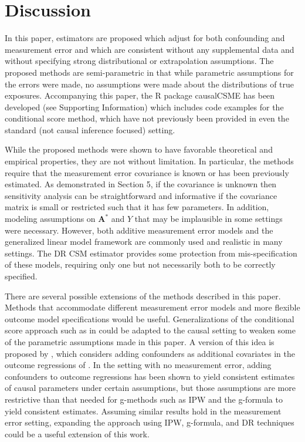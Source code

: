 \documentclass[useAMS,usenatbib,referee]{biom}
\begin{document}
\section{Discussion}

In this paper, estimators are proposed which adjust for both confounding and measurement error and which are consistent without any supplemental data and without specifying strong distributional or extrapolation assumptions. The proposed methods are semi-parametric in that while parametric assumptions for the errors were made, no assumptions were made about the distributions of true exposures. Accompanying this paper, the R package causalCSME has been developed (see Supporting Information) which includes code examples for the conditional score method, which have not previously been provided in even the standard (not causal inference focused) setting.

While the proposed methods were shown to have favorable theoretical and empirical properties, they are not without limitation. In particular, the methods require that the measurement error covariance is known or has been previously estimated. As demonstrated in Section 5, if the covariance is unknown then sensitivity analysis can be straightforward and informative if the covariance matrix is small or restricted such that it has few parameters. In addition, modeling assumptions on $\bm{A}^{*}$ and $Y$ that may be implausible in some settings were necessary. However, both additive measurement error models and the generalized linear model framework are commonly used and realistic in many settings. The DR CSM estimator provides some protection from mis-specification of these models, requiring only one but not necessarily both to be correctly specified.

There are several possible extensions of the methods described in this paper. Methods that accommodate different measurement error models and more flexible outcome model specifications would be useful. Generalizations of the conditional score approach such as in \citet{tsiatis2004} could be adapted to the causal setting to weaken some of the parametric assumptions made in this paper. A version of this idea is proposed by \citet{liu2017}, which considers adding confounders as additional covariates in the outcome regressions of \citet{tsiatis2004}. In the setting with no measurement error, adding confounders to outcome regressions has been shown to yield consistent estimates of causal parameters under certain assumptions, but those assumptions are more restrictive than that needed for g-methods such as IPW and the g-formula to yield consistent estimates. Assuming similar results hold in the measurement error setting, expanding the \citet{liu2017} approach using IPW, g-formula, and DR techniques could be a useful extension of this work.
\end{document}
